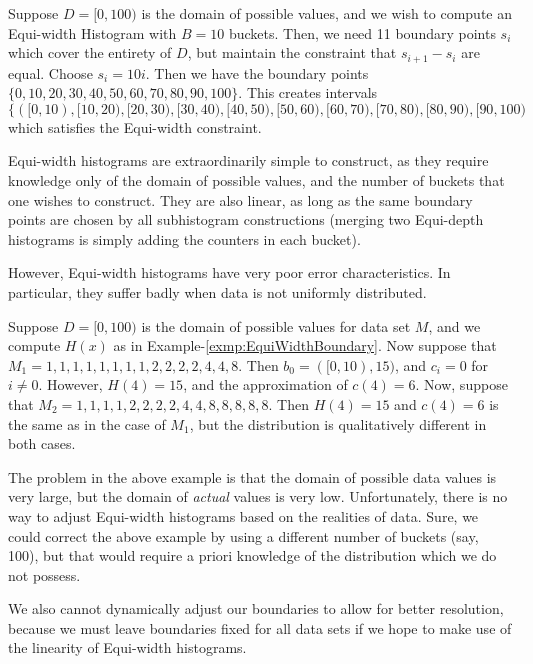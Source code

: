 \begin{exmp}
				\label{exmp:EquiWidthBoundary}
				Suppose $D = [0,100)$ is the domain of possible values, and we wish to compute an Equi-width Histogram with $B = 10$ buckets. Then, we need 11 boundary points $s_i$ which cover the entirety of $D$, but maintain the constraint that $s_{i+1}-s_i$ are equal. Choose $s_i = 10i$. Then we have the boundary points $\lbrace 0,10,20,30,40,50,60,70,80,90,100 \rbrace$. This creates intervals $\lbrace ([0,10),[10,20),[20,30),[30,40),[40,50),[50,60),[60,70),[70,80),[80,90),[90,100)$ which satisfies the Equi-width constraint.
\end{exmp}

Equi-width histograms are extraordinarily simple to construct, as they require knowledge only of the domain of possible values, and the number of buckets that one wishes to construct. They are also linear, as long as the same boundary points are chosen by all subhistogram constructions (merging two Equi-depth histograms is simply adding the counters in each bucket).

However, Equi-width histograms have very poor error characteristics\cite{PiatetskyTuple}. In particular, they suffer badly when data is not uniformly distributed.

\begin{exmp}
				\label{exmp:EquiWidthResolution}
				Suppose $D = [0,100)$ is the domain of possible values for data set $M$, and we compute $H(x)$ as in Example-\ref{exmp:EquiWidthBoundary}.
								Now suppose that $M_1 = {1,1,1,1,1,1,1,1,2,2,2,2,4,4,8}$. Then $b_0 = ([0,10),15)$, and $c_i = 0$ for $i \neq 0$. However, $H(4) = 15$, and the approximation of $c(4) = 6$. 
												Now, suppose that $M_2 = {1,1,1,1,2,2,2,2,4,4,8,8,8,8,8}$. Then $H(4) = 15$ and $c(4) = 6$ is the same as in the case of $M_1$, but the distribution is qualitatively different in both cases.
\end{exmp}

The problem in the above example is that the domain of possible data values is very large, but the domain of \emph{actual} values is very low. Unfortunately, there is no way to adjust Equi-width histograms based on the realities of data. Sure, we could correct the above example by using a different number of buckets (say, 100), but that would require a priori knowledge of the distribution which we do not possess.

We also cannot dynamically adjust our boundaries to allow for better resolution, because we must leave boundaries fixed for all data sets if we hope to make use of the linearity of Equi-width histograms.

